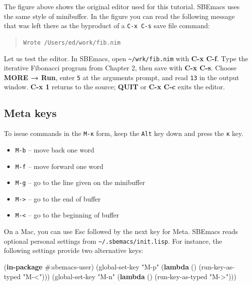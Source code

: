 \documentclass[
  12pt,
]{book}
\newenvironment{Shaded}{}{}
\newcommand{\KeywordTok}[1]{\textcolor[rgb]{0.00,0.44,0.13}{\textbf{#1}}}
\newcommand{\NormalTok}[1]{#1}
\newcommand{\StringTok}[1]{\textcolor[rgb]{0.25,0.44,0.63}{#1}}
\providecommand{\tightlist}{%
  \setlength{\itemsep}{0pt}\setlength{\parskip}{0pt}}
\begin{document}
The figure above shows the original editor used for this tutorial.
SBEmacs uses the same style of minibuffer. In the figure you can read
the following message that was left there as the byproduct of a
\texttt{C-x\ C-s} save file command:

\begin{quote}
\texttt{Wrote\ /Users/ed/work/fib.nim}
\end{quote}

Let us test the editor. In SBEmacs, open
\texttt{\textasciitilde{}/wrk/fib.nim} with \textbf{C-x C-f}. Type the
iterative Fibonacci program from Chapter 2, then save with \textbf{C-x
C-s}. Choose \textbf{MORE → Run}, enter \texttt{5} at the arguments
prompt, and read \texttt{13} in the output window. \textbf{C-x 1}
returns to the source; \textbf{QUIT} or \textbf{C-x C-c} exits the
editor.

\subsection*{Meta keys}\label{Meta}

To issue commands in the \texttt{M-κ} form, keep the \texttt{Alt} key
down and press the \texttt{κ} key.

\begin{itemize}
\tightlist
\item
  \texttt{M-b} -- move back one word
\item
  \texttt{M-f} -- move forward one word
\item
  \texttt{M-g} -- go to the line given on the minibuffer
\item
  \texttt{M-\textgreater{}} -- go to the end of buffer
\item
  \texttt{M-\textless{}} -- go to the beginning of buffer
\end{itemize}

On a Mac, you can use Esc followed by the next key for Meta. SBEmacs
reads optional personal settings from
\texttt{\textasciitilde{}/.sbemacs/init.lisp}. For instance, the
following settings provide two alternative keys:

\begin{Shaded}
\begin{Highlighting}[]
\NormalTok{(}\KeywordTok{in{-}package}\NormalTok{ \#:sbemacs{-}user)}
\NormalTok{(global{-}set{-}key }\StringTok{"M{-}p"}\NormalTok{ (}\KeywordTok{lambda}\NormalTok{ () (run{-}key{-}as{-}typed }\StringTok{"M{-}\textless{}"}\NormalTok{)))}
\NormalTok{(global{-}set{-}key }\StringTok{"M{-}n"}\NormalTok{ (}\KeywordTok{lambda}\NormalTok{ () (run{-}key{-}as{-}typed }\StringTok{"M{-}\textgreater{}"}\NormalTok{)))}
\end{Highlighting}
\end{Shaded}
\end{document}
